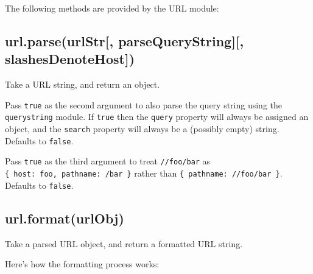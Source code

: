 The following methods are provided by the URL module:

\subsection{url.parse(urlStr{[}, parseQueryString{]}{[},
slashesDenoteHost{]})}\label{url.parseurlstr-parsequerystring-slashesdenotehost}

Take a URL string, and return an object.

Pass \texttt{true} as the second argument to also parse the query string
using the \texttt{querystring} module. If \texttt{true} then the
\texttt{query} property will always be assigned an object, and the
\texttt{search} property will always be a (possibly empty) string.
Defaults to \texttt{false}.

Pass \texttt{true} as the third argument to treat \texttt{//foo/bar} as
\texttt{\{\ host:\ \textquotesingle{}foo\textquotesingle{},\ pathname:\ \textquotesingle{}/bar\textquotesingle{}\ \}}
rather than
\texttt{\{\ pathname:\ \textquotesingle{}//foo/bar\textquotesingle{}\ \}}.
Defaults to \texttt{false}.

\subsection{url.format(urlObj)}\label{url.formaturlobj}

Take a parsed URL object, and return a formatted URL string.

Here's how the formatting process works:

